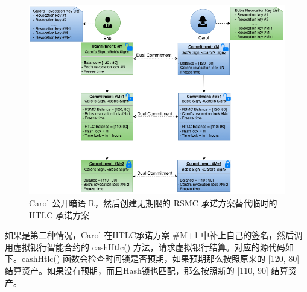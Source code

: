 \begin{figure}[h!]
    \centering
    \includegraphics[width=12cm, keepaspectratio]{../images/bob_carol_3.png}
    \caption{Carol 公开暗语 R，然后创建无期限的 RSMC 承诺方案替代临时的 HTLC 承诺方案}
    \label{fig:bob_carol_3}
\end{figure}

如果是第二种情况，Carol 在HTLC承诺方案 \#M+1 中补上自己的签名，然后调用虚拟银行智能合约的 cashHtlc() 方法，请求虚拟银行结算。对应的源代码如下。cashHtlc() 函数会检查时间锁是否预期，如果预期那么按照原来的 [120, 80] 结算资产。如果没有预期，而且Hash锁也匹配，那么按照新的 [110, 90] 结算资产。

